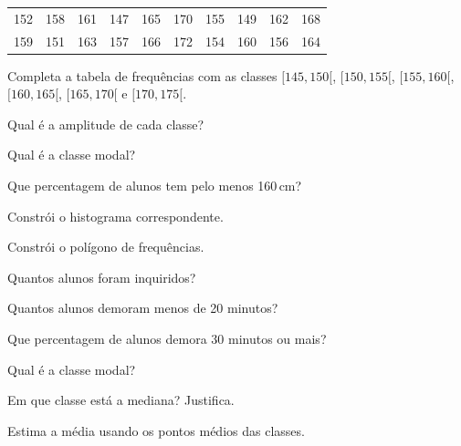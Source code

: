 \documentclass[12pt]{article}
\begin{document}



\begin{center}
\begin{tabular}{cccccccccc}
  152 & 158 & 161 & 147 & 165 & 170 & 155 & 149 & 162 & 168 \\
  159 & 151 & 163 & 157 & 166 & 172 & 154 & 160 & 156 & 164 \\
\end{tabular}
\end{center}

\begin{exercicios}
  \item Completa a tabela de frequências com as classes $[145, 150[$, $[150, 155[$, $[155, 160[$, $[160, 165[$, $[165, 170[$ e $[170, 175[$.
  \item Qual é a amplitude de cada classe?
  \item Qual é a classe modal?
  \item Que percentagem de alunos tem pelo menos 160\,cm?
  \item Constrói o histograma correspondente.
  \item Constrói o polígono de frequências.
\end{exercicios}


\begin{center}
\end{center}

\begin{exercicios}
  \item Quantos alunos foram inquiridos?
  \item Quantos alunos demoram menos de 20 minutos?
  \item Que percentagem de alunos demora 30 minutos ou mais?
  \item Qual é a classe modal?
  \item Em que classe está a mediana? Justifica.
  \item Estima a média usando os pontos médios das classes.
\end{exercicios}
\end{document}
